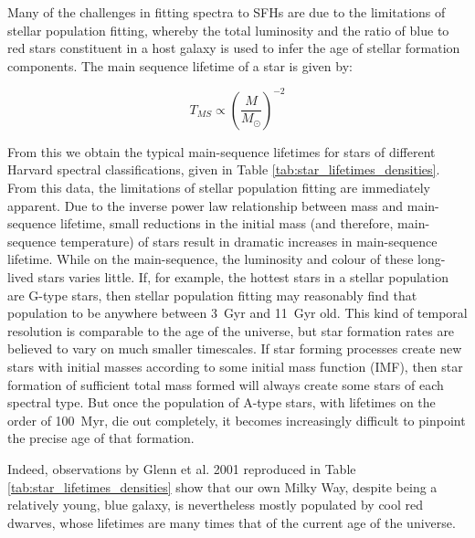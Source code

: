 \documentclass[a4paper,11pt]{article}
\begin{document}
Many of the challenges in fitting spectra to SFHs are due to the limitations of stellar population fitting, whereby the total luminosity and the ratio of blue to red stars constituent in a host galaxy is used to infer the age of stellar formation components. The main sequence lifetime of a star is given by\cite{Prialnik_2010}:

\begin{equation}
  T_{MS} \propto \left(\frac{M}{M_\odot}\right)^{-2}
\end{equation}

\noindent From this we obtain the typical main-sequence lifetimes for stars of different Harvard spectral classifications, given in Table \ref{tab:star_lifetimes_densities}. From this data, the limitations of stellar population fitting are immediately apparent. Due to the inverse power law relationship between mass and main-sequence lifetime, small reductions in the initial mass (and therefore, main-sequence temperature) of stars result in dramatic increases in main-sequence lifetime. While on the main-sequence, the luminosity and colour of these long-lived stars varies little.\cite{Prialnik_2010} If, for example, the hottest stars in a stellar population are G-type stars, then stellar population fitting may reasonably find that population to be anywhere between \SI{3}{Gyr} and \SI{11}{Gyr} old. This kind of temporal resolution is comparable to the age of the universe, but star formation rates are believed to vary on much smaller timescales.\cite{Kauffmann_2003c} If star forming processes create new stars with initial masses according to some initial mass function (IMF), then star formation of sufficient total mass formed will always create some stars of each spectral type. But once the population of A-type stars, with lifetimes on the order of \SI{100}{Myr}, die out completely, it becomes increasingly difficult to pinpoint the precise age of that formation.

Indeed, observations by Glenn et al. 2001 reproduced in Table \ref{tab:star_lifetimes_densities} show that our own Milky Way, despite being a relatively young, blue galaxy, is nevertheless mostly populated by cool red dwarves, whose lifetimes are many times that of the current age of the universe.

%
\end{document}

